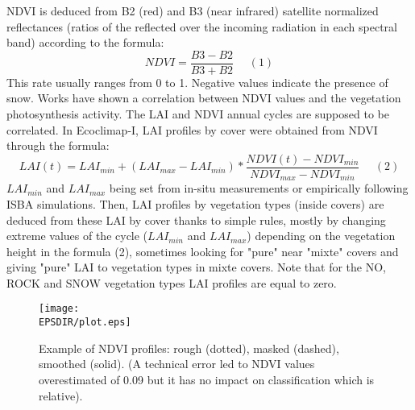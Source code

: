 NDVI is deduced from B2 (red) and B3 (near infrared) satellite normalized reflectances (ratios of the reflected over the incoming radiation 
in each spectral band) 
according to the formula: 
\begin{displaymath}
NDVI=\frac{B3-B2}{B3+B2}~~~~~~(1)
\end{displaymath}
This rate usually ranges from 0 to 1. Negative values indicate the presence of snow. Works have shown a correlation between NDVI values and the 
vegetation photosynthesis activity. The LAI and NDVI annual cycles are supposed to be correlated. In Ecoclimap-I, 
LAI profiles by cover were obtained from NDVI through the formula: 
\begin{displaymath}
LAI(t)=LAI_{min}+(LAI_{max}-LAI_{min})*\frac{NDVI(t)-NDVI_{min}}{NDVI_{max}-NDVI_{min}}~~~~~~(2)
\end{displaymath} 
$LAI_{min}$ and $LAI_{max}$ being set from in-situ measurements or empirically following ISBA simulations. Then, LAI profiles by vegetation types 
(inside covers) are deduced from these LAI by cover thanks to simple rules, mostly by changing extreme values of the cycle ($LAI_{min}$ and $LAI_{max}$) 
depending on the vegetation height in the formula (2), sometimes looking for "pure" near "mixte" covers and giving "pure" LAI to 
vegetation types in mixte covers. Note that for the NO, ROCK and SNOW vegetation types LAI profiles are equal to zero. \\

 
\begin{figure}
\begin{center}
\texttt{[image: \\EPSDIR/plot.eps]}
\caption{\label{figure1} Example of NDVI profiles: rough (dotted), masked (dashed), smoothed (solid). 
(A technical error led to NDVI values overestimated of 0.09 but it has no impact on classification which is relative). }
\end{center}
\end{figure}


